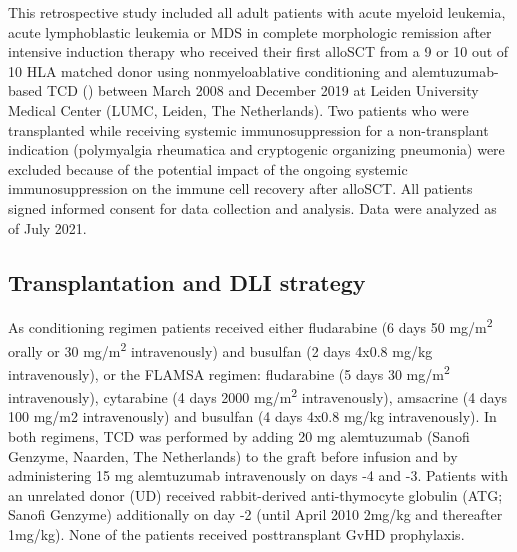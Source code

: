 \documentclass[
  letterpaper,
  paper=240mm:170mm,
  twoside=true,
  open=right,
  fontsize=10pt,
  pagesize=false,
  BCOR=15mm,
  DIV=14,
  headinclude=true,
  footinclude=false,
  headsepline=on]{scrbook}
\begin{document}
This retrospective study included all adult patients with acute myeloid
leukemia, acute lymphoblastic leukemia or MDS in complete morphologic
remission after intensive induction therapy who received their first
alloSCT from a 9 or 10 out of 10 HLA matched donor using
nonmyeloablative conditioning and alemtuzumab-based TCD
() between March 2008 and December 2019 at
Leiden University Medical Center (LUMC, Leiden, The Netherlands). Two
patients who were transplanted while receiving systemic
immunosuppression for a non-transplant indication (polymyalgia
rheumatica and cryptogenic organizing pneumonia) were excluded because
of the potential impact of the ongoing systemic immunosuppression on the
immune cell recovery after alloSCT. All patients signed informed consent
for data collection and analysis. Data were analyzed as of July 2021.

\subsection{Transplantation and DLI
strategy}\label{transplantation-and-dli-strategy}

As conditioning regimen patients received either fludarabine (6 days 50
mg/m\textsuperscript{2} orally or 30 mg/m\textsuperscript{2}
intravenously) and busulfan (2 days 4x0.8 mg/kg intravenously), or the
FLAMSA regimen: fludarabine (5 days 30 mg/m\textsuperscript{2}
intravenously), cytarabine (4 days 2000 mg/m\textsuperscript{2}
intravenously), amsacrine (4 days 100 mg/m2 intravenously) and busulfan
(4 days 4x0.8 mg/kg intravenously). In both regimens, TCD was performed
by adding 20 mg alemtuzumab (Sanofi Genzyme, Naarden, The Netherlands)
to the graft before infusion and by administering 15 mg alemtuzumab
intravenously on days -4 and -3. Patients with an unrelated donor (UD)
received rabbit-derived anti-thymocyte globulin (ATG; Sanofi Genzyme)
additionally on day -2 (until April 2010 2mg/kg and thereafter 1mg/kg).
None of the patients received posttransplant GvHD prophylaxis.
\end{document}
